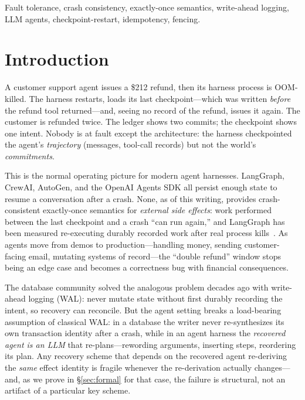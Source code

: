 \documentclass[10pt,journal,compsoc]{IEEEtran}
\begin{document}
\begin{IEEEkeywords}
Fault tolerance, crash consistency, exactly-once semantics,
write-ahead logging, LLM agents, checkpoint-restart, idempotency,
fencing.
\end{IEEEkeywords}

\section{Introduction}
\label{sec:intro}

A customer support agent issues a \$212 refund, then its harness
process is OOM-killed. The harness restarts, loads its last
checkpoint---which was written \emph{before} the refund tool
returned---and, seeing no record of the refund, issues it again.
The customer is refunded twice. The ledger shows two commits; the
checkpoint shows one intent. Nobody is at fault except the
architecture: the harness checkpointed the agent's \emph{trajectory}
(messages, tool-call records) but not the world's \emph{commitments}.

This is the normal operating picture for modern agent harnesses.
LangGraph, CrewAI, AutoGen, and the OpenAI Agents SDK all persist
enough state to resume a conversation after a crash. None, as of
this writing, provides crash-consistent exactly-once semantics for
\emph{external side effects}: work performed between the last
checkpoint and a crash ``can run again,'' and LangGraph has been
measured re-executing durably recorded work after real process
kills~\cite{khan2026resume}. As agents move from demos to
production---handling money, sending customer-facing email, mutating
systems of record---the ``double refund'' window stops being an edge
case and becomes a correctness bug with financial consequences.

The database community solved the analogous problem decades ago
with write-ahead logging (WAL): never mutate state without first
durably recording the intent, so recovery can reconcile. But the
agent setting breaks a load-bearing assumption of classical WAL:
in a database the writer never re-synthesizes its own transaction
identity after a crash, while in an agent harness the \emph{recovered
agent is an LLM} that re-plans---rewording arguments, inserting
steps, reordering its plan. Any recovery scheme that depends on the
recovered agent re-deriving the \emph{same} effect identity is
fragile whenever the re-derivation actually changes---and, as we
prove in \S\ref{sec:formal} for that case, the failure is
structural, not an artifact of a particular key scheme.
\end{document}
